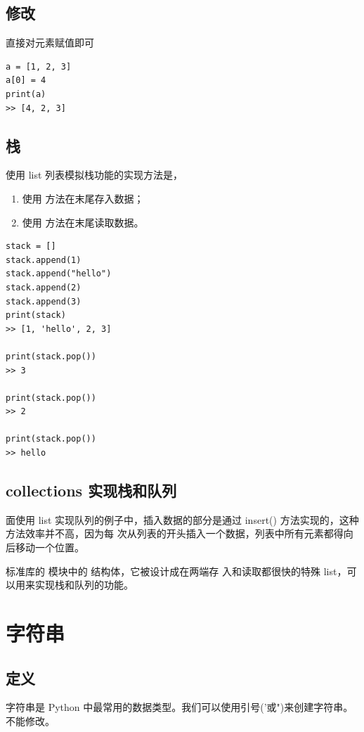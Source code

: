 \subsection{修改}
直接对元素赋值即可
\begin{lstlisting}[style=demostyle,numbers=none]
a = [1, 2, 3]
a[0] = 4
print(a)
>> [4, 2, 3]
\end{lstlisting}

\subsection{栈}
使用 list 列表模拟栈功能的实现方法是，
\begin{enumerate}[label=\arabic*)]
    \item 使用  方法\textcolor{YBXPurple}{在末尾}存入数据；
    \item 使用  方法\textcolor{YBXPurple}{在末尾}读取数据。
\end{enumerate}

\begin{lstlisting}[style=demostyle,numbers=none]
stack = []
stack.append(1)
stack.append("hello")
stack.append(2)
stack.append(3)
print(stack)
>> [1, 'hello', 2, 3]

print(stack.pop())
>> 3

print(stack.pop())
>> 2

print(stack.pop())
>> hello
\end{lstlisting}

\subsection{collections 实现栈和队列}
面使用 list 实现队列的例子中，插入数据的部分是通过 insert() 方法实现的，这种方法效率并不高，因为每
次从列表的开头插入一个数据，列表中所有元素都得向后移动一个位置。

标准库的  模块中的  结构体，它被设计成在两端存
入和读取都很快的特殊 list，可以用来实现栈和队列的功能。



\section{字符串}
\subsection{定义}
字符串是 Python 中最常用的数据类型。我们可以使用引号('或")来创建字符串。\textcolor{YBXPurple}{不能修改}。


